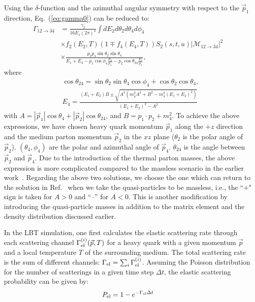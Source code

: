 \documentclass[aps,superscriptaddress,prc,twocolumn,nofootinbib]{revtex4}
\begin{document}
Using the $\delta$-function and the azimuthal angular symmetry with respect to the $\vec{p}_1$ direction, Eq.~(\ref{eq:gamma0}) can be reduced to:
\begin{align}
\Gamma_{12\to 34} &=\frac{\gamma_2}{16 E_1 (2 \pi)^4}\int dE_2 d\theta_2 d\theta_4 d\phi_4 \nonumber\\
 &\times f_2(E_2,T)(1\mp f_4(E_4,T))S_2(s,t,u) \big| \mathcal{M_\mathrm{12\rightarrow34}} \big|^2
 \nonumber\\
 &\times \frac{p_2 p_4 \sin \theta_2 \sin \theta_4}{E_1+E_2-p_1 \cos \phi_4 \frac{E_4}{p_4}-p_2 \cos\theta_{24} \frac{E_4}{p_4}},
 \label{eq:gamma1}
\end{align}
where
\begin{align}
& \cos\theta_{24} = \sin \theta_2 \sin \theta_4 \cos \phi_4+ \cos \theta_2 \cos \theta_4,
\\
& E_4  = \frac{(E_1 + E_2)B \pm \sqrt{A^2 (m_4^2 A^2 + B^2 - m_4^2(E_1 + E_2)^2)}}{(E_1 + E_2)^2 - A^2}
\end{align}
with $A = |\vec{p}_1|\cos \theta_4 + |\vec{p}_2|\cos \theta_{24}$, and $B = p_1 \cdot p_2 + m_4^2$. To achieve the above expressions, we have chosen heavy quark momentum $\vec{p}_1$ along the $+z$ direction and the medium parton momentum $\vec{p}_2$ in the $xz$ plane ($\theta_2$ is the polar angle of $\vec{p}_2$). $(\theta_4, \phi_4)$ are the polar and azimuthal angle of $\vec{p}_4$. $\theta_{24}$ is the angle between $\vec{p}_2$ and $\vec{p}_4$. Due to the introduction of the thermal parton masses, the above expression is more complicated compared to the massless scenario in the earlier work~\cite{Cao:2016gvr}. Regarding the above two solutions, we choose the one which can return to the solution in Ref.~\cite{Cao:2016gvr} when we take the quasi-particles to be massless, i.e., the ``+" sign is taken for $A > 0$ and ``--” for $A < 0$. This is another modification by introducing the quasi-particle masses in addition to the matrix element and the density distribution discussed earlier.

In the LBT simulation, one first calculates the elastic scattering rate through each scattering channel $\Gamma_{\rm el}^{(i)}(\vec{p}, T)$ for a heavy quark with a given momentum $\vec{p}$ and a local temperature $T$ of the surrounding medium. The total scattering rate is the sum of different channels: $\Gamma_{\rm el} = \sum_{i} \Gamma_{\rm el}^{(i)}$.
Assuming the Poisson distribution for the number of scatterings in a given time step $\Delta t$, the elastic scattering probability can be given by:
\begin{align}
	P_{\rm el} = 1 - e^{-\Gamma_{\rm el} \Delta t}
\end{align}
\end{document}
